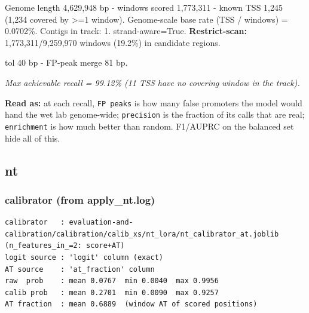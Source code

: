 \documentclass[10pt]{article}
\begin{document}
Genome length 4,629,948 bp - windows scored 1,773,311 - known TSS 1,245 (1,234 covered by >=1 window). Genome-scale base rate (TSS / windows) = 0.0702\%. Contigs in track: 1. strand-aware=True. \textbf{Restrict-scan:} 1,773,311/9,259,970 windows (19.2\%) in candidate regions.

tol 40 bp - FP-peak merge 81 bp.

\begin{center}
\end{center}

{\itshape Max achievable recall = 99.12\% (11 TSS have no covering window in the track).}

\textbf{Read as:} at each recall, \texttt{FP peaks} is how many false promoters the model would hand the wet lab genome-wide; \texttt{precision} is the fraction of its calls that are real; \texttt{enrichment} is how much better than random. F1/AUPRC on the balanced set hide all of this.

\subsection*{nt}

\subsubsection*{calibrator (from apply\_nt.log)}
\begin{verbatim}
calibrator   : evaluation-and-calibration/calibration/calib_xs/nt_lora/nt_calibrator_at.joblib  (n_features_in_=2: score+AT)
logit source : 'logit' column (exact)
AT source    : 'at_fraction' column
raw  prob    : mean 0.0767  min 0.0040  max 0.9956
calib prob   : mean 0.2701  min 0.0090  max 0.9257
AT fraction  : mean 0.6889  (window AT of scored positions)
\end{verbatim}
\end{document}
